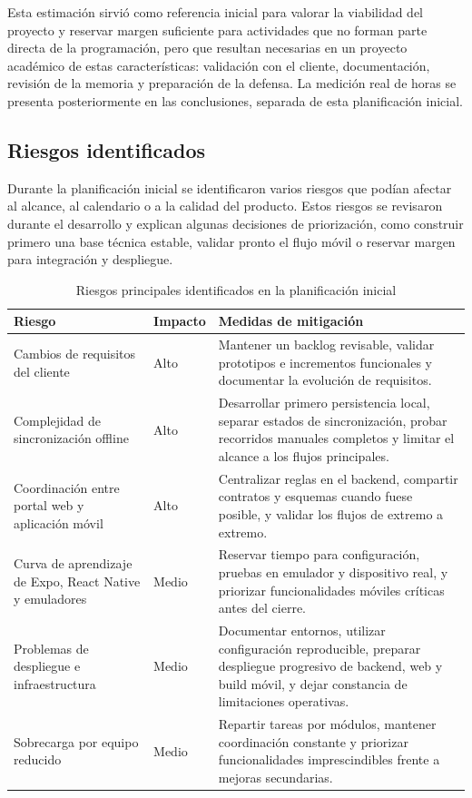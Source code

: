 Esta estimación sirvió como referencia inicial para valorar la viabilidad del
proyecto y reservar margen suficiente para actividades que no forman parte directa
de la programación, pero que resultan necesarias en un proyecto académico de estas
características: validación con el cliente, documentación, revisión de la memoria y
preparación de la defensa. La medición real de horas se presenta posteriormente en
las conclusiones, separada de esta planificación inicial.

\subsection{Riesgos identificados}

Durante la planificación inicial se identificaron varios riesgos que podían afectar
al alcance, al calendario o a la calidad del producto. Estos riesgos se revisaron
durante el desarrollo y explican algunas decisiones de priorización, como construir
primero una base técnica estable, validar pronto el flujo móvil o reservar margen
para integración y despliegue.

\begin{table}[H]
\centering
\caption{Riesgos principales identificados en la planificación inicial}
\label{tab:riesgos_planificacion_inicial}
\small
\renewcommand{\arraystretch}{1.18}
\begin{tabularx}{\textwidth}{p{3.7cm}p{1.8cm}X}
\toprule
\textbf{Riesgo} & \textbf{Impacto} & \textbf{Medidas de mitigación} \\
\midrule
Cambios de requisitos del cliente & Alto & Mantener un backlog revisable, validar prototipos e incrementos funcionales y documentar la evolución de requisitos. \\
Complejidad de sincronización offline & Alto & Desarrollar primero persistencia local, separar estados de sincronización, probar recorridos manuales completos y limitar el alcance a los flujos principales. \\
Coordinación entre portal web y aplicación móvil & Alto & Centralizar reglas en el backend, compartir contratos y esquemas cuando fuese posible, y validar los flujos de extremo a extremo. \\
Curva de aprendizaje de Expo, React Native y emuladores & Medio & Reservar tiempo para configuración, pruebas en emulador y dispositivo real, y priorizar funcionalidades móviles críticas antes del cierre. \\
Problemas de despliegue e infraestructura & Medio & Documentar entornos, utilizar configuración reproducible, preparar despliegue progresivo de backend, web y build móvil, y dejar constancia de limitaciones operativas. \\
Sobrecarga por equipo reducido & Medio & Repartir tareas por módulos, mantener coordinación constante y priorizar funcionalidades imprescindibles frente a mejoras secundarias. \\
\bottomrule
\end{tabularx}
\end{table}


